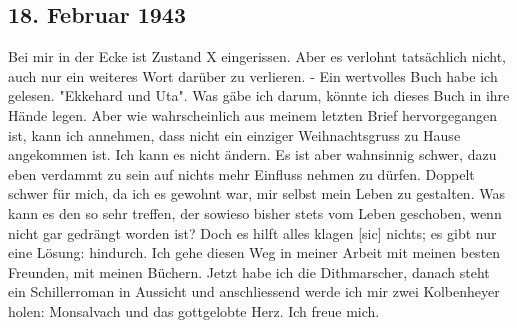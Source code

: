 \subsection{18. Februar 1943}

Bei mir in der Ecke ist Zustand X eingerissen.
Aber es verlohnt tats\"{a}chlich nicht, auch nur ein weiteres Wort dar\"{u}ber zu verlieren.
- Ein wertvolles Buch habe ich gelesen.
"Ekkehard und Uta".
Was g\"{a}be ich darum, k\"{o}nnte ich dieses Buch in ihre H\"{a}nde legen.
Aber wie wahrscheinlich aus meinem letzten Brief hervorgegangen ist, kann ich annehmen, dass nicht ein einziger Weihnachtsgruss zu Hause angekommen ist.
Ich kann es nicht \"{a}ndern.
Es ist aber wahnsinnig schwer, dazu eben verdammt zu sein auf nichts mehr Einfluss nehmen zu d\"{u}rfen.
Doppelt schwer f\"{u}r mich, da ich es gewohnt war, mir selbst mein Leben zu gestalten.
Was kann es den so sehr treffen, der sowieso bisher stets vom Leben geschoben, wenn nicht gar gedr\"{a}ngt worden ist?
Doch es hilft alles klagen{\color{red} [sic] } nichts; es gibt nur eine L\"{o}sung: hindurch.
Ich gehe diesen Weg in meiner Arbeit mit meinen besten Freunden, mit meinen B\"{u}chern.
Jetzt habe ich die Dithmarscher, danach steht ein Schillerroman in Aussicht und anschliessend werde ich mir zwei Kolbenheyer holen: Monsalvach und das gottgelobte Herz.
Ich freue mich.

\clearpage
